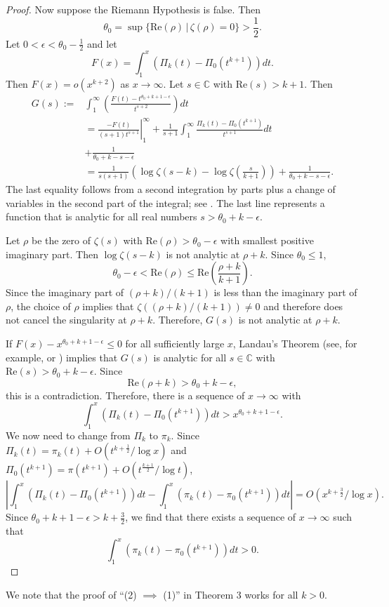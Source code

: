 \documentclass[12pt]{amsart}
\begin{document}
\begin{proof}
Now suppose the Riemann Hypothesis is false. Then  
$$
\theta_0 = \sup\{\text{Re}(\rho) \, | \, \zeta(\rho)=0\} > \frac12.$$
 Let $0<\epsilon <\theta_0-\frac12$ and let 
$$
F(x) = \int_1^x \left(\Pi_k(t) - \Pi_0(t^{k+1})\right) dt.
$$
Then $F(x) = o\left(x^{k+2}\right)$ as $x\to\infty$.
Let $s\in \mathbb C$ with $\text{Re}(s) > k+1$. Then
\begin{align*}
G(s):=&\int_1^{\infty} \left(\frac{F(t) - t^{\theta_0+k+1-\epsilon}}{t^{s+2}}\right) dt\\
 &=\left.\frac{-F(t)}{(s+1)t^{s+1}}\right|_1^{\infty} + \frac{1}{s+1} \int_1^{\infty} \frac{\Pi_k(t) - \Pi_0(t^{k+1})}{t^{s+1}} dt\\
&  +\frac{1}{\theta_0+k-s-\epsilon}    \\
&= \frac{1}{s(s+1)}\left( \log\zeta(s-k) - \log\zeta(\frac{s}{k+1})\right)  +\frac{1}{\theta_0+k-s-\epsilon} .
\end{align*}
The last equality follows from a second integration by parts plus a change of variables in the second part of the integral; see \cite[p.  173]{GW}.
The last line represents a function that is analytic for all real numbers $s> \theta_0+k-\epsilon$. 

Let $\rho$ be the zero of $\zeta(s)$ with $\text{Re}(\rho)>\theta_0-\epsilon$ with smallest positive imaginary part. 
Then $\log\zeta(s-k)$ is not analytic at $\rho+k$. Since $\theta_0\le 1$,
$$
\theta_0 - \epsilon < \text{Re}(\rho) \le \text{Re}\left(\frac{\rho+k}{k+1}\right).
$$
Since the imaginary part of $(\rho+k)/(k+1)$ is less than the imaginary part of $\rho$, the choice of $\rho$ implies that $\zeta((\rho+k)/(k+1))\ne 0$ and therefore does not cancel the singularity at $\rho+k$.
Therefore, $G(s)$ is not analytic at $\rho+k$.

If $F(x) - x^{\theta_0+k+1-\epsilon}\le 0$ for all sufficiently large $x$, Landau's Theorem (see, for example, \cite{GW} or \cite{I}) implies that  $G(s)$ is analytic for all $s\in \mathbb C$ with
$\text{Re}(s) > \theta_0+k-\epsilon$. Since
$$
\text{Re}(\rho+k)> \theta_0+k-\epsilon ,
$$
this is a contradiction. Therefore, there is a sequence of $x\to \infty$ with
$$
 \int_1^x \left(\Pi_k(t) - \Pi_0(t^{k+1})\right) dt > x^{\theta_0+k+1-\epsilon}.
$$
We now need to change from $\Pi_k$ to $\pi_k$.  Since $\Pi_k(t) = \pi_k(t) + O(t^{k+\frac12}/\log x)$ and $\Pi_0(t^{k+1}) = \pi(t^{k+1}) + O(t^{\frac{k+1}{2}}/\log t)$, 
$$
\left| \int_1^x \left(\Pi_k(t) - \Pi_0(t^{k+1})\right)  dt -  \int_1^x \left(\pi_k(t) - \pi_0(t^{k+1})\right)  dt \right| = O( x^{k+\frac32}/\log x).
$$
Since $\theta_0+k+1-\epsilon > k+\frac32$, we find that there exists a sequence of $x\to\infty$ such that
$$
 \int_1^x \left(\pi_k(t) - \pi_0(t^{k+1})\right) dt >  0.
$$
\end{proof}
We note that the proof of ``(2) $\implies$ (1)'' in Theorem 3 works for all $k>0$.
\end{document}
